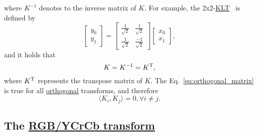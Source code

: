 where $K^{-1}$ denotes to the inverse matrix of $K$. For example, the
2x2-\href{https://en.wikipedia.org/wiki/Karhunen-Loeve_theorem}{KLT}~\cite{sayood2017introduction}
is defined by
\begin{equation}
  \begin{bmatrix}
    y_0 \\
    y_1
  \end{bmatrix}
  = 
  \begin{bmatrix} \frac{1}{\sqrt{2}} & \frac{1}{\sqrt{2}} \\ \frac{1}{\sqrt{2}} & \frac{-1}{\sqrt{2}} \end{bmatrix}
  \begin{bmatrix}
    x_0 \\
    x_1
  \end{bmatrix},
  \label{eq:KLT_transform}
\end{equation}
and it holds that
\begin{equation}
  K=K^{-1}=K^{\text T},
  \label{eq:orthogonal_matrix}
\end{equation}
where $K^{\text T}$ represents the transpose matrix of $K$. The
Eq.~\ref{eq:orthogonal_matrix} is true for all
\href{https://en.wikipedia.org/wiki/Orthogonality}{orthogonal}
transforms, and therefore
\begin{equation}
  \langle K_i, K_j\rangle = 0, \forall i\neq j.
\end{equation}

\subsection{The \href{https://en.wikipedia.org/wiki/YCbCr}{RGB/YCrCb transform}}
